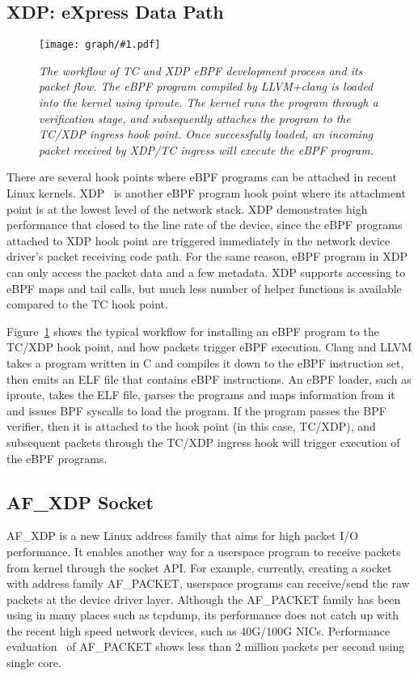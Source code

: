 \documentclass[10pt,numbers,reprint]{sigplanconf}
\newcommand{\myfig}[3]
 {
 \begin{figure}
 \centerline{\texttt{[image: graph/\#1.pdf]}}
 \caption{\sl \small #3}
 \label{#1:fig}
 \vspace*{-0.15in}
 \end{figure}
 }
\begin{document}
\subsection{XDP: eXpress Data Path}
\myfig{tcebpf}{2.6in}{The workflow of TC and XDP eBPF development process and its
packet flow.  The eBPF program compiled by LLVM+clang is loaded into the kernel
using iproute. The kernel runs the program through a verification stage, and
subsequently attaches the program to the TC/XDP ingress hook point.  Once
successfully loaded, an incoming packet received by XDP/TC ingress will execute the
eBPF program.}

There are several hook points where eBPF programs can be attached in recent
Linux kernels. XDP~\cite{xdp,xdp2,xdp-conext18} is another eBPF program hook point where
its attachment point is at the lowest level of the network stack.
XDP demonstrates high performance that closed to the line rate of the device,
since the eBPF programs attached to XDP hook point are triggered immediately
in the network device driver's packet receiving code path. For the same reason,
eBPF program in XDP can only access the packet data and a few metadata.
XDP supports accessing to eBPF maps and tail calls, but much less number of
helper functions is available compared to the TC hook point.

Figure~\ref{tcebpf:fig}
shows the typical workflow for installing an eBPF program to the TC/XDP hook point,
and how packets trigger eBPF execution.  Clang and LLVM takes a program
written in C and compiles it down to the eBPF instruction set, then emits an
ELF file that contains eBPF instructions.  An eBPF loader, such as iproute,
takes the ELF file, parses the programs and maps information from it and
issues BPF syscalls to load the program.  If the program passes the BPF verifier,
then it is attached to the hook point (in this case, TC/XDP), and
subsequent packets through the TC/XDP ingress hook will trigger execution of the
eBPF programs.

\subsection{AF\_XDP Socket}
AF\_XDP is a new Linux address family that aims for high packet I/O
performance. It enables another way for a userspace program to receive
packets from kernel through the socket API. For example, currently, creating
a socket with address family AF\_PACKET, userspace programs can receive/send
the raw packets
at the device driver layer.  Although the AF\_PACKET family has been using
in many places such as tcpdump, its performance does not catch up with the
recent high speed network devices, such as 40G/100G NICs.
Performance evaluation~\cite{af_packet_v4,af_packet_performance} of AF\_PACKET
shows less than 2 million packets per second using single core.
\end{document}
